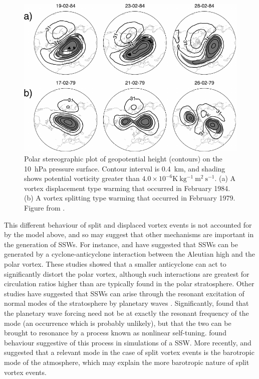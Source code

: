 \begin{figure}
 \centering
 \noindent\includegraphics[width=\textwidth]{figures/chapter-intro/charlton_polvani_SSW.pdf}
 \caption[A split and displaced vortex event from \citet{Charlton2007}]{Polar
   stereographic plot of geopotential height (contours) on the 10~hPa pressure
   surface. Contour interval is 0.4~km, and shading shows potential vorticity
   greater than $4.0 \times 10^{-6} \mathrm{K~kg^{-1}~m^2~s^{-1}}$. (a) A vortex
   displacement type warming that occurred in February 1984. (b) A vortex
   splitting type warming that occurred in February 1979. Figure from
   \citet{Charlton2007}.}
 \label{fig:charlton_polvani_ssw}
\end{figure}

This different behaviour of split and displaced vortex events is not accounted
for by the \citet{Matsuno1970, Matsuno1971} model above, and so may suggest that
other mechanisms are important in the generation of SSWs. For instance,
\citet{ONeill1988} and \citet{Scott2006} have suggested that SSWs can be
generated by a cyclone-anticyclone interaction between the Aleutian high and the
polar vortex. These studies showed that a smaller anticyclone can act to
significantly distort the polar vortex, although such interactions are greatest
for circulation ratios higher than are typically found in the polar
stratosphere. Other studies have suggested that SSWs can arise through the
resonant excitation of normal modes of the stratosphere by planetary waves
\citep{Tung1979}. Significantly, \citet{Plumb1981} found that the planetary wave
forcing need not be at exactly the resonant frequency of the mode (an occurrence
which is probably unlikely), but that the two can be brought to resonance by a
process known as nonlinear self-tuning. \citet{Smith1989} found behaviour
suggestive of this process in simulations of a SSW. More recently,
\citet{Esler2005} and \citet{Esler2006} suggested that a relevant mode in the
case of split vortex events is the barotropic mode of the atmosphere, which may
explain the more barotropic nature of split vortex events.

